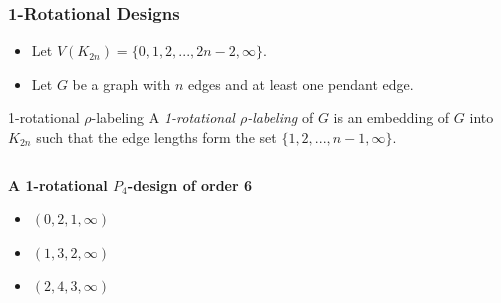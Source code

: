 \documentclass[11pt,serif,professionalfont,aspectratio=169]{beamer}
\newcommand{\vertex}{\node[vertex]}
\theoremstyle{plain}
\begin{document}
\begin{frame}
\frametitle{1-Rotational Designs}
\begin{itemize}
\item Let $V(K_{2n})=\{0,1,2,...,2n-2,\infty\}.$\\

\item Let $G$ be a graph with $n$ edges and at least one pendant edge.
\end{itemize}

\begin{block}{1-rotational $\rho$-labeling}
A \emph{1-rotational $\rho$-labeling} of $G$ is an embedding of $G$ into $K_{2n}$ such that the edge lengths form the set $\{1,2,...,n-1,\infty\}.$
\end{block}

\begin{columns}[T] %
\begin{column}{.48\textwidth}
\textbf{A 1-rotational $P_{4}$-design of order 6}
\begin{itemize}
\item \color{black} $(0,2,1,\infty)$ 
\item \color{blue} $(1,3,2,\infty)$ 
\item \color{red} $(2,4,3,\infty)$ 

\end{itemize}
\end{column}%
\hfill%
\begin{column}{.48\textwidth}
\begin{center}

\end{center}
\end{column}%
\end{columns}

\end{frame}
\end{document}
